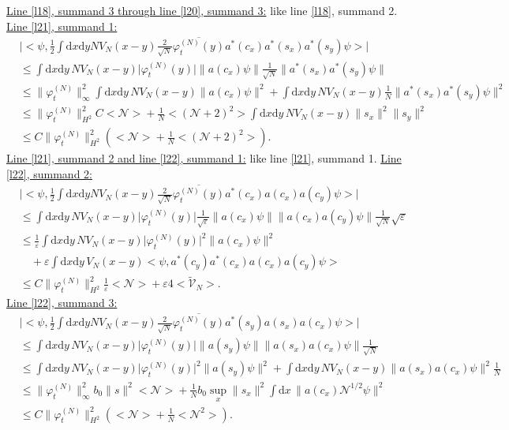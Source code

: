 \documentclass[11pt,a4paper,draft,DIV11]{scrartcl}	%
\newcommand{\di}{\textrm{d}}		%
\newcommand{\Ncal}{\mathcal{N}}		%
\newcommand{\tilV}{\tilde{\mathcal{V}}_N}		%
\newcommand{\estlist}[2]{\underline{Line \ref{l#1}, summand #2:}}
\newcommand{\nestlist}[2]{line \ref{l#1}, summand #2}
\newcommand{\Nestlist}[2]{Line \ref{l#1}, summand #2}
\newcommand{\scal}[2]{\big<#1,#2\big>} %
\newcommand{\cc}[1]{\overline{#1}}	%
\newcommand{\norm}[1]{\lVert#1\rVert}	%
\newcommand{\ev}[1]{\big<#1\big>}	%
\newcommand{\ph}{\varphi_t^{(N)}}	%
\newcommand{\dxyNV}{\frac{1}{2}\int \di x\di y N V_N(x-y)} %
\begin{document}
\underline{\Nestlist{18}{3} through \nestlist{20}{3}:} like \nestlist{18}{2}.\newline
\estlist{21}{1}
\begin{align*}
 & \lvert \scal{\psi}{\dxyNV \frac{2}{\sqrt{N}}\cc{\ph(y)}a^\ast(c_x)a^\ast(s_x)a^\ast(s_y)\psi} \rvert \\
& \leq \int \di x\di y\, NV_N(x-y) \lvert\ph(y)\rvert \norm{a(c_x)\psi}\frac{1}{\sqrt{N}}\norm{a^\ast(s_x)a^\ast(s_y)\psi} \\
& \leq \norm{\ph}_\infty^2 \int \di x\di y\, NV_N(x-y) \norm{a(c_x)\psi}^2 + \int \di x\di y\, NV_N(x-y) \frac{1}{N} \norm{a^\ast(s_x)a^\ast(s_y)\psi}^2 \\
& \leq \norm{\ph}_{H^2}^2 C \ev{\Ncal} + \frac{1}{N}\ev{(\Ncal+2)^2} \int \di x\di y\, NV_N(x-y) \norm{s_x}^2 \norm{s_y}^2 \\
& \leq C\norm{\ph}_{H^2}^2 \left( \ev{\Ncal} + \frac{1}{N}\ev{(\Ncal+2)^2} \right).
\end{align*}
\underline{\Nestlist{21}{2} and \nestlist{22}{1}:} like \nestlist{21}{1}.\newline
\estlist{22}{2}
\begin{align*}
 & \lvert \scal{\psi}{\dxyNV \frac{2}{\sqrt{N}}\cc{\ph(y)} a^\ast(c_x)a(c_x)a(c_y)\psi} \rvert \\
& \leq \int \di x\di y\, NV_N(x-y) \lvert \ph(y)\rvert \frac{1}{\sqrt{\varepsilon}} \norm{a(c_x)\psi} \norm{a(c_x)a(c_y)\psi} \frac{1}{\sqrt{N}}\sqrt{\varepsilon} \\
& \leq \frac{1}{\varepsilon}\int \di x\di y\, NV_N(x-y) \lvert \ph(y)\rvert^2
  \norm{a(c_x)\psi}^2 \\
& \quad  + \varepsilon \int \di x\di y\, V_N(x-y) \scal{\psi}{a^\ast(c_y)a^\ast(c_x)a(c_x)a(c_y) \psi} \\
& \leq C\norm{\ph}_{H^2}^2 \frac{1}{\varepsilon}\ev{\Ncal} + \varepsilon 4\ev{\tilV}.
\end{align*}
\estlist{22}{3}
\begin{align*}
& \lvert \scal{\psi}{\dxyNV \frac{2}{\sqrt{N}} \cc{\ph(y)}a^\ast(s_y)a(s_x)a(c_x)\psi} \rvert \\
& \leq \int \di x\di y\, NV_N(x-y) \lvert \ph(y)\rvert \norm{a(s_y)\psi} \norm{a(s_x)a(c_x)\psi}\frac{1}{\sqrt{N}} \\
& \leq \int \di x \di y\, NV_N(x-y) \lvert\ph(y)\rvert^2 \norm{a(s_y)\psi}^2 + \int \di x\di y\, NV_N(x-y) \norm{a(s_x)a(c_x)\psi}^2 \frac{1}{N} \\
& \leq \norm{\ph}_\infty^2 b_0 \norm{s}^2 \ev{\Ncal} + \frac{1}{N}b_0 \sup_x\norm{s_x}^2 \int \di x\, \norm{a(c_x)\Ncal^{1/2}\psi}^2 \\
& \leq C \norm{\ph}_{H^2}^2 \left( \ev{\Ncal} + \frac{1}{N}\ev{\Ncal^2}\right). 
\end{align*}
\end{document}
